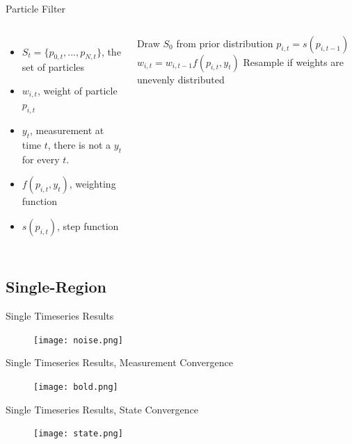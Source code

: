 \documentclass{beamer}
\begin{document}
\begin{frame}{Particle Filter}
    \begin{columns}
    \column{1.8in}
    \begin{itemize}
        \item $S_t = \{p_{0,t}, ... , p_{N,t}\}$, the set of particles
        \item $w_{i,t}$, weight of particle $p_{i,t}$
        \item $y_t$, measurement at time $t$, there is not a $y_t$ for every $t$.
        \item $f(p_{i,t},y_t)$, weighting function 
        \item $s(p_{i,t})$, step function 
    \end{itemize}
    \column{3.2in}
    \begin{algorithmic}
     \STATE Draw $S_0$ from prior distribution 
           \STATE $p_{i,t} = s(p_{i,t-1})$ 
                    \STATE $w_{i,t} = w_{i,t-1}f(p_{i,t},y_t)$
               \ENDFOR 
               \STATE Resample if weights are unevenly distributed\\
           \ENDIF
        \ENDFOR
     \ENDFOR
     \end{algorithmic}
     \end{columns}
\end{frame}

\subsection{Single-Region}
\begin{frame}{Single Timeseries Results}
  \begin{figure}
    \texttt{[image: noise.png]}
  \end{figure}
\end{frame}

\begin{frame}{Single Timeseries Results, Measurement Convergence}
  \begin{figure}
    \texttt{[image: bold.png]}
  \end{figure}
\end{frame}

\begin{frame}{Single Timeseries Results, State Convergence}
  \begin{figure}
    \texttt{[image: state.png]}
  \end{figure}
\end{frame}
\end{document}

